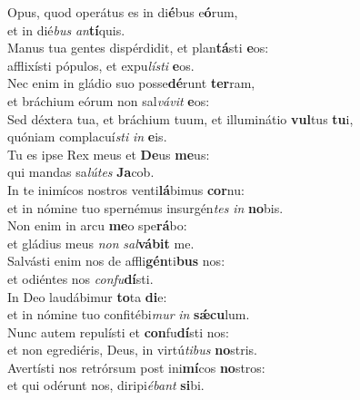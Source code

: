 \evenverse Opus, quod operátus es in di\textbf{é}bus e\textbf{ó}rum,~\*\\
\evenverse et in dié\textit{bus} \textit{an}\textbf{tí}quis.\\
\oddverse Manus tua gentes dispérdidit, et plan\textbf{tá}sti \textbf{e}os:~\*\\
\oddverse afflixísti pópulos, et expu\textit{lí}\textit{sti} \textbf{e}os.\\
\evenverse Nec enim in gládio suo posse\textbf{dé}runt \textbf{ter}ram,~\*\\
\evenverse et bráchium eórum non sal\textit{vá}\textit{vit} \textbf{e}os:\\
\oddverse Sed déxtera tua, et bráchium tuum, et illuminátio \textbf{vul}tus \textbf{tu}i,~\*\\
\oddverse quóniam complacuí\textit{sti} \textit{in} \textbf{e}is.\\
\evenverse Tu es ipse Rex meus et \textbf{De}us \textbf{me}us:~\*\\
\evenverse qui mandas sa\textit{lú}\textit{tes} \textbf{Ja}cob.\\
\oddverse In te inimícos nostros venti\textbf{lá}bimus \textbf{cor}nu:~\*\\
\oddverse et in nómine tuo spernémus insurgén\textit{tes} \textit{in} \textbf{no}bis.\\
\evenverse Non enim in arcu \textbf{me}o spe\textbf{rá}bo:~\*\\
\evenverse et gládius meus \textit{non} \textit{sal}\textbf{vá}\textbf{bit} me.\\
\oddverse Salvásti enim nos de affli\textbf{gén}ti\textbf{bus} nos:~\*\\
\oddverse et odiéntes nos \textit{con}\textit{fu}\textbf{dí}sti.\\
\evenverse In Deo laudábimur \textbf{to}ta \textbf{di}e:~\*\\
\evenverse et in nómine tuo confitébi\textit{mur} \textit{in} \textbf{sǽ}\textbf{cu}lum.\\
\oddverse Nunc autem repulísti et \textbf{con}fu\textbf{dí}sti nos:~\*\\
\oddverse et non egrediéris, Deus, in virtú\textit{ti}\textit{bus} \textbf{no}stris.\\
\evenverse Avertísti nos retrórsum post ini\textbf{mí}cos \textbf{no}stros:~\*\\
\evenverse et qui odérunt nos, diripi\textit{é}\textit{bant} \textbf{si}bi.\\
